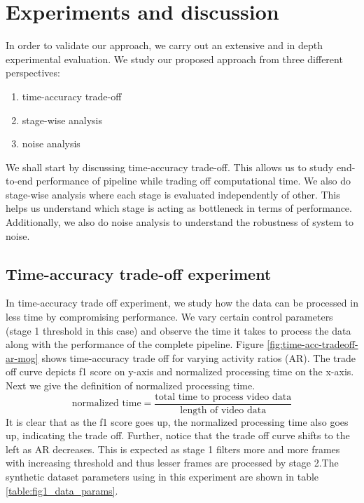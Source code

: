 \section{Experiments and discussion}
In order to validate our approach, we carry out an extensive and in depth experimental evaluation.  We study our proposed approach from three different perspectives: 

\begin{enumerate}
\item time-accuracy trade-off
\item stage-wise analysis
\item noise analysis
\end{enumerate}

We shall start by discussing time-accuracy trade-off. This allows us to study end-to-end performance of pipeline while trading off computational time.  We also do stage-wise analysis where each stage is evaluated independently of other. This helps us understand which stage is acting as bottleneck in terms of performance. Additionally, we also do noise analysis to understand the robustness of system to noise.

\subsection{Time-accuracy trade-off experiment}
In time-accuracy trade off experiment, we study how the data can be processed in less time by compromising performance. We vary certain control parameters (stage 1 threshold in this case) and observe the time it takes to process the data along with the performance of the complete pipeline. Figure \ref{fig:time-acc-tradeoff-ar-mog} shows time-accuracy trade off for varying activity ratios (AR). The trade off curve depicts f1 score on y-axis and normalized processing time on the x-axis. Next we give the definition of normalized processing time. 
$$\text{normalized time} = \frac{\text{total time to process video data}}{\text{length of video data}}$$
It is clear that as the f1 score goes up, the normalized processing time also goes up, indicating the trade off. Further, notice that the trade off curve shifts to the left as AR decreases. This is expected as stage 1 filters more and more frames with increasing threshold and thus lesser frames are processed by stage 2.The synthetic dataset parameters using in this experiment are shown in table \ref{table:fig1_data_params}. 

